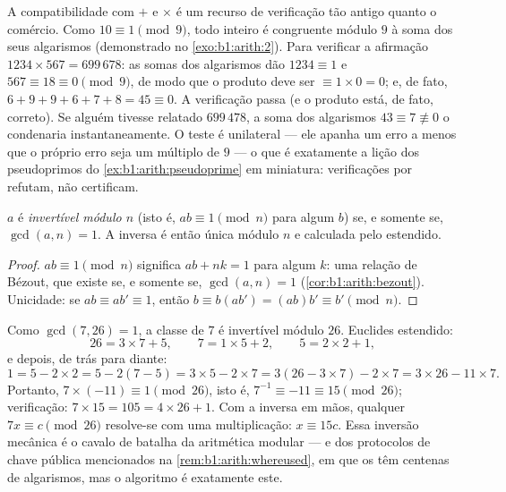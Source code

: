 \begin{example}\label{ex:b1:arith:castingnines}
A compatibilidade com $+$ e $\times$ é um recurso de verificação tão
antigo quanto o comércio. Como $10 \equiv 1 \pmod 9$, todo inteiro é
congruente módulo $9$ à soma dos seus algarismos (demonstrado no
\cref{exo:b1:arith:2}). Para verificar a afirmação $1234 \times 567 =
699\,678$: as somas dos algarismos dão $1234 \equiv 1$ e $567 \equiv 18
\equiv 0 \pmod 9$, de modo que o produto deve ser $\equiv 1 \times 0 =
0$; e, de fato, $6 + 9 + 9 + 6 + 7 + 8 = 45 \equiv 0$. A verificação
passa (e o produto está, de fato, correto). Se alguém tivesse relatado
$699\,478$, a soma dos algarismos $43 \equiv 7 \not\equiv 0$ o
condenaria instantaneamente. O teste é unilateral --- ele apanha um
erro a menos que o próprio erro seja um múltiplo de $9$ --- o que é
exatamente a lição dos pseudoprimos do
\cref{ex:b1:arith:pseudoprime} em miniatura: verificações por 
refutam, não certificam.
\end{example}

\begin{proposition}\label{prop:b1:arith:invmod}
$a$ é \emph{invertível módulo $n$} (isto é, $ab \equiv 1 \pmod n$ para algum
$b$) se, e somente se, $\gcd(a, n) = 1$. A inversa é então única módulo
$n$ e calculada pelo  estendido.
\end{proposition}

\begin{proof}
$ab \equiv 1 \pmod n$ significa $ab + nk = 1$ para algum $k$: uma relação
de Bézout, que existe se, e somente se, $\gcd(a,n) = 1$
(\cref{cor:b1:arith:bezout}). Unicidade: se $ab \equiv ab' \equiv 1$,
então $b \equiv b(ab') = (ab)b' \equiv b' \pmod n$.
\end{proof}

\begin{example}\label{ex:b1:arith:inv7mod26}
Como $\gcd(7, 26) = 1$, a classe de $7$ é invertível módulo $26$.
Euclides estendido:
\[
26 = 3 \times 7 + 5, \qquad
7 = 1 \times 5 + 2, \qquad
5 = 2 \times 2 + 1 ,
\]
e depois, de trás para diante:
\[
1 = 5 - 2 \times 2 = 5 - 2(7 - 5) = 3 \times 5 - 2 \times 7
= 3(26 - 3 \times 7) - 2 \times 7 = 3 \times 26 - 11 \times 7 .
\]
Portanto, $7 \times (-11) \equiv 1 \pmod{26}$, isto é, $7^{-1} \equiv
-11 \equiv 15 \pmod{26}$; verificação: $7 \times 15 = 105 = 4 \times 26
+ 1$. Com a inversa em mãos, qualquer  $7x \equiv c
\pmod{26}$ resolve-se com uma multiplicação: $x \equiv 15c$. Essa
inversão mecânica é o cavalo de batalha da aritmética modular ---
e dos protocolos de chave pública mencionados na
\cref{rem:b1:arith:whereused}, em que os  têm centenas de
algarismos, mas o algoritmo é exatamente este.
\end{example}

